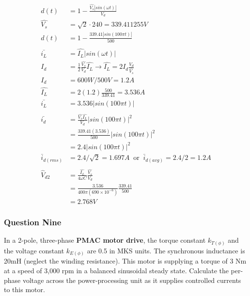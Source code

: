 \documentclass[a4paper,11pt]{article}
\begin{document}
\begin{align*}
    d(t)             & = 1-\frac{\hat{V_s}|sin(\omega t)|}{V_d}                                                       \\
    \hat{V_s}        & = \sqrt{2}{\cdot}240 = 339.411255V                                                                    \\
    d(t)             & = 1-\frac{339.41|sin(100\pi t)|}{500}                                                          \\\\
    \bar{i_L}        & = \hat{I_L}|sin(\omega t)|                                                                     \\
    I_d              & = \frac{1}{2}\frac{\hat{V_s}}{V_d}\hat{I_L} \rightarrow \hat{I_L} = 2I_d \frac{V_d}{\hat{V_s}} \\
    I_d              & = 600W/500V=1.2A                                                                               \\
    \hat{I_L}        & = 2(1.2) \frac{500}{339.41} = 3.536A                                                           \\
    \bar{i_L}        & = 3.536|sin(100\pi t)|                                                                         \\\\
    \bar{i_d}        & = \frac{\hat{V_s}\hat{I_L}}{V_d}|sin(100\pi t)|^2                                              \\
                     & = \frac{339.41(3.536)}{500}|sin(100\pi t)|^2                                                   \\
                     & = 2.4|sin(100\pi t)|^2                                                                         \\
    \bar{i}_{d(rms)} & = 2.4/\sqrt{2} = 1.697A \;\;\mathrm{or}\;\; \bar{i}_{d(avg)} = 2.4/2 = 1.2A                    \\\\
    \hat{V}_{d2}     & = \frac{\hat{I_L}}{4\omega C}\frac{\hat{V_s}}{V_d}                                             \\
                     & = \frac{3.536}{400\pi(690\times10^{-6})}\frac{339.41}{500}                                     \\
                     & = 2.768V
\end{align*}

\newpage
\subsubsection*{Question Nine}
In a 2-pole, three-phase \textbf{PMAC motor drive}, the torque constant $k_{T(\phi)}$ and the voltage constant $k_{E(\phi)}$ are 0.5 in MKS units. The synchronous inductance is 20mH (neglect the winding resistance). This motor is supplying a torque of 3 Nm at a speed of 3,000 rpm in a balanced sinusoidal steady state. Calculate the per-phase voltage across the power-processing unit as it supplies controlled currents to this motor.
\end{document}
